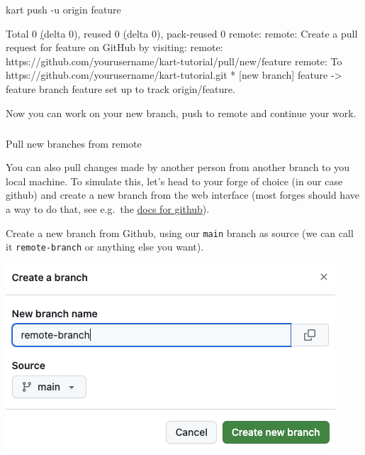 \documentclass[
  letterpaper,
  DIV=11,
  numbers=noendperiod]{scrartcl}
\makeatletter
\let\oldsubparagraph\subparagraph
\renewcommand{\subparagraph}{
    \@ifstar
      \xxxSubParagraphStar
      \xxxSubParagraphNoStar
  }
\newcommand{\xxxSubParagraphStar}[1]{\oldsubparagraph*{#1}\mbox{}}
\newcommand{\xxxSubParagraphNoStar}[1]{\oldsubparagraph{#1}\mbox{}}
\newenvironment{Shaded}{\begin{snugshade}}{\end{snugshade}}
\newcommand{\AttributeTok}[1]{\textcolor[rgb]{1.00,0.47,0.78}{#1}}
\newcommand{\ErrorTok}[1]{\textcolor[rgb]{1.00,0.33,0.33}{\underline{#1}}}
\newcommand{\ExtensionTok}[1]{\textcolor[rgb]{0.55,0.91,0.99}{#1}}
\newcommand{\KeywordTok}[1]{\textcolor[rgb]{1.00,0.47,0.78}{#1}}
\newcommand{\NormalTok}[1]{\textcolor[rgb]{0.97,0.97,0.95}{#1}}
\newcommand{\OperatorTok}[1]{\textcolor[rgb]{0.97,0.97,0.95}{#1}}
\newcommand{\StringTok}[1]{\textcolor[rgb]{0.95,0.98,0.55}{#1}}
\makeatother
\begin{document}
\begin{Shaded}
\begin{Highlighting}[]
\ExtensionTok{kart}\NormalTok{ push }\AttributeTok{{-}u}\NormalTok{ origin feature}

\ExtensionTok{Total}\NormalTok{ 0 }\ErrorTok{(}\ExtensionTok{delta}\NormalTok{ 0}\KeywordTok{)}\ExtensionTok{,}\NormalTok{ reused 0 }\ErrorTok{(}\ExtensionTok{delta}\NormalTok{ 0}\KeywordTok{)}\ExtensionTok{,}\NormalTok{ pack{-}reused 0}
\ExtensionTok{remote:}
\ExtensionTok{remote:}\NormalTok{ Create a pull request for }\StringTok{\textquotesingle{}feature\textquotesingle{}}\NormalTok{ on GitHub by visiting:}
\ExtensionTok{remote:}\NormalTok{      https://github.com/yourusername/kart{-}tutorial/pull/new/feature}
\ExtensionTok{remote:}
\ExtensionTok{To}\NormalTok{ https://github.com/yourusername/kart{-}tutorial.git}
 \ExtensionTok{*}\NormalTok{ [new branch]      feature }\AttributeTok{{-}}\OperatorTok{\textgreater{}}\NormalTok{ feature}
\ExtensionTok{branch} \StringTok{\textquotesingle{}feature\textquotesingle{}}\NormalTok{ set up to track }\StringTok{\textquotesingle{}origin/feature\textquotesingle{}}\NormalTok{.}
\end{Highlighting}
\end{Shaded}

Now you can work on your new branch, push to remote and continue your
work.

\subparagraph{Pull new branches from
remote}\label{pull-new-branches-from-remote}

You can also pull changes made by another person from another branch to
you local machine. To simulate this, let's head to your forge of choice
(in our case github) and create a new branch from the web interface
(most forges should have a way to do that, see e.g.~the
\href{https://docs.github.com/en/pull-requests/collaborating-with-pull-requests/proposing-changes-to-your-work-with-pull-requests/creating-and-deleting-branches-within-your-repository}{docs
for github}).

Create a new branch from Github, using our \texttt{main} branch as
source (we can call it \texttt{remote-branch} or anything else you
want).

\begin{center}
\includegraphics{img/github-create-new-branch.png}
\end{center}
\end{document}
